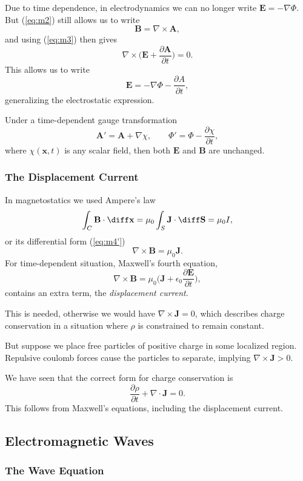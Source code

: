 \documentclass[12pt]{article}
\begin{document}
Due to time dependence, in electrodynamics we can no longer write $\mathbf{E} = - \nabla \Phi$. But (\ref{eq:m2}) still allows us to write
\[
\mathbf{B} = \nabla \times \mathbf{A}
,\]
and using (\ref{eq:m3}) then gives
\[
\nabla \times \biggl( \mathbf{E} + \frac{\partial \mathbf{A}}{\partial t} \biggr) = 0
.\]
This allows us to write
\[
\mathbf{E} = - \nabla \Phi - \frac{\partial A}{\partial t}
,\]
generalizing the electrostatic expression.

Under a time-dependent gauge transformation
\[
\mathbf{A}' = \mathbf{A} + \nabla \chi, \qquad \Phi' = \Phi - \frac{\partial \chi}{\partial t}
,\]
where $\chi(\mathbf{x}, t)$ is any scalar field, then both $\mathbf{E}$ and $\mathbf{B}$ are unchanged.

\subsubsection{The Displacement Current}
\label{subsub:the_displacement_current}

In magnetostatics we used Ampere's law
\[
\int_{C} \mathbf{B} \cdot \diff \mathbf{x} = \mu_0 \int_{S} \mathbf{J} \cdot \diff \mathbf{S} = \mu_0 I
,\]
or its differential form (\ref{eq:m4'})
\[
\nabla \times \mathbf{B} = \mu_0 \mathbf{J}
.\]
For time-dependent situation, Maxwell's fourth equation,
\[
	\nabla \times \mathbf{B} = \mu_0 \biggl( \mathbf{J} + \epsilon_0 \frac{\partial \mathbf{E}}{\partial t} \biggr) \tag{M4}\label{eq:m4}
,\]
contains an extra term, the \emph{displacement current}.

This is needed, otherwise we would have $\nabla \times \mathbf{J} = 0$, which describes charge conservation in a situation where $\rho$ is constrained to remain constant.

But suppose we place free particles of positive charge in some localized region. Repulsive coulomb forces cause the particles to separate, implying $\nabla \times \mathbf{J} > 0$.

We have seen that the correct form for charge conservation is
\[
	\frac{\partial \rho}{\partial t} + \nabla \cdot \mathbf{J} = 0
.\]
This follows from Maxwell's equations, including the displacement current.

\subsection{Electromagnetic Waves}
\label{sub:electromagnetic_waves}

\subsubsection{The Wave Equation}
\label{subsub:the_wave_equation}
\end{document}

